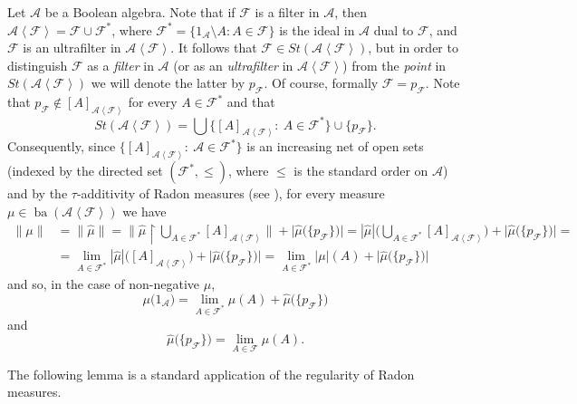 \documentclass[a4paper,11pt,fleqn]{amsart}
\theoremstyle{definition}
\theoremstyle{remark}
\numberwithin{equation}{section}
\newcommand{\aA}{\mathcal{A}}
\newcommand{\fF}{\mathcal{F}}
\DeclareMathOperator{\ba}{ba}
\newcommand{\rstr}{\restriction}
\newcommand{\sm}{\setminus}
\newcommand{\wh}{\widehat}
\newcommand{\gen}[1]{\mathopen{}\left\langle#1\mathclose{}\right\rangle}
\newcommand{\clopen}[1]{\left[#1\right]}
\begin{document}
Let $\aA$ be a Boolean algebra. Note that if $\fF$ is a filter in $\aA$, then $\aA\gen{\fF}=\fF\cup\fF^*$, where $\fF^*=\{1_\aA\sm A\colon A\in\fF\}$ is the ideal in $\aA$ dual to $\fF$, and $\fF$ is an ultrafilter in $\aA\gen{\fF}$. It follows that $\fF\in St(\aA\gen{\fF})$, but in order to distinguish $\fF$ as a \textit{filter} in $\aA$ (or as an \textit{ultrafilter} in $\aA\gen{\fF}$) from the \textit{point} in $St(\aA\gen{\fF})$ we will denote the latter by $p_\fF$. Of course, formally $\fF=p_\fF$. Note that $p_\fF\not\in\clopen{A}_{\aA\gen{\fF}}$ for every $A\in\fF^*$ and that
\[\tag{$\star$}St(\aA\gen{\fF})=\bigcup\big\{\clopen{A}_{\aA\gen{\fF}}\colon\ A\in\fF^*\big\}\cup\big\{p_\fF\big\}.\]
Consequently, since $\big\{\clopen{A}_{\aA\gen{\fF}}\colon\ \aA\in\fF^*\big\}$ is an increasing net of open sets (indexed by the directed set $(\fF^*,\le)$, where $\le$ is the standard order on $\aA$) and by the $\tau$-additivity of Radon measures (see \cite[Section 7.2]{BogV2}), for every measure $\mu\in\ba(\aA\gen{\fF})$ we have
\begin{align*}\tag{$+$}
\|\mu\|&=\|\wh{\mu}\|=\Big\|\wh{\mu}\rstr\bigcup_{A\in\fF^*}\clopen{A}_{\aA\gen{\fF}}\Big\|+\big|\wh{\mu}\big(\big\{p_\fF\big\}\big)\big|=|\wh{\mu}|\Big(\bigcup_{A\in\fF^*}\clopen{A}_{\aA\gen{\fF}}\Big)+\big|\wh{\mu}\big(\big\{p_\fF\big\}\big)\big|=\\
&=\lim_{A\in\fF^*}|\wh{\mu}|\big(\clopen{A}_{\aA\gen{\fF}}\big)+\big|\wh{\mu}\big(\big\{p_\fF\big\}\big)\big|=\lim_{A\in\fF^*}|\mu|(A)+\big|\wh{\mu}\big(\big\{p_\fF\big\}\big)\big|
\end{align*}
and so, in the case of non-negative $\mu$,
\[\mu\big(1_\aA\big)=\lim_{A\in\fF^*}\mu(A)+\wh{\mu}\big(\big\{p_\fF\big\}\big)\]
and
\[\wh{\mu}\big(\big\{p_\fF\big\}\big)=\lim_{A\in\fF}\mu(A).\]

The following lemma is a standard application of the regularity of Radon measures.
\end{document}
